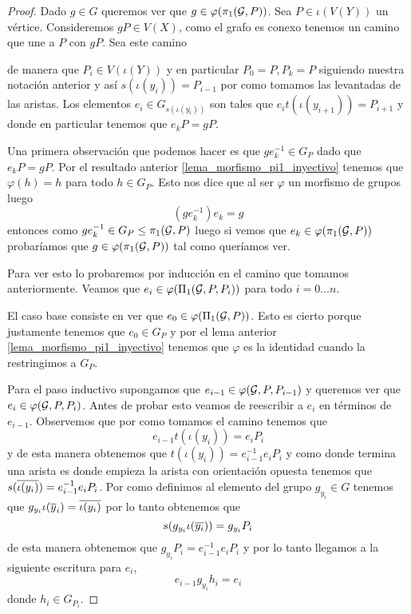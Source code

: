 \documentclass[tesis.tex]{subfiles}
\begin{document}
\begin{proof}
	Dado $g \in G$ queremos ver que $g \in \varphi(\pi_1({\cal G}, P))$.
	Sea $P \in \iota(V(Y))$ un vértice.
	Consideremos $gP \in V(X)$, como el grafo es conexo tenemos un camino que une a $P$ con $gP$. 
	Sea este camino 
	
	\begin{center}
	\end{center}
	


	de manera que $P_i \in V(\iota (Y))$ y en particular $P_0 = P, P_k = P$ siguiendo nuestra notación anterior y así $s(\iota (y_i)) = P_{i-1}$ por como tomamos las levantadas de las aristas.
	Los elementos $e_i \in G_{s(\iota (y_i))}$ son tales que $e_i t(\iota (y_{i+1})) = P_{i+1}$ y donde en particular tenemos que $e_k P = g P$.
	
	Una primera observación que podemos hacer es que $g e_k^{-1} \in G_P$ dado que  $e_k P = g P$.
	Por el resultado anterior \ref{lema_morfismo_pi1_inyectivo} tenemos que $\varphi(h) = h $ para todo $h \in G_P$.
	Esto nos dice que al ser $\varphi$ un morfismo de grupos luego 
	\[
	(ge_k^{-1}) e_k = g
	\]
	entonces como $ge_k^{-1} \in G_P \le \pi_1({\cal G}, P)$ luego si vemos que $e_k \in \varphi(\pi_1({\cal G}, P))$ probaríamos que $g \in \varphi (\pi_1({\cal G},P))$ tal como queríamos ver.
		
	Para ver esto lo probaremos por inducción en el camino que tomamos anteriormente.
	Veamos que $e_i \in \varphi(\Pi_1({\cal G}, P, P_i))$ para todo $i = 0 \dots n$.
	
	El caso base consiste en ver que $e_0 \in \varphi(\Pi_1({\cal G}, P))$.
	Esto es cierto porque justamente tenemos que $e_0 \in G_P$ y por el lema anterior \ref{lema_morfismo_pi1_inyectivo} tenemos que $\varphi$ es la identidad cuando la restringimos a $G_P$.
	
	Para el paso inductivo supongamos que $e_{i-1} \in \varphi({\cal G}, P, P_{i-1})$ y queremos ver que $e_i \in \varphi({\cal G}, P, P_{i})$.
	Antes de probar esto veamos de reescribir a $e_i$ en términos de $e_{i-1}$.
	Observemos que por como tomamos el camino tenemos que
	\[
		e_{i-1} t(\iota (y_i)) = e_i P_i 
	\]
	y de esta manera obtenemos que $t(\iota (y_i)) = e_{i-1}^{-1} e_i P_i$ y como donde termina una arista es donde empieza la arista con orientación opuesta tenemos que $s(\overline{\iota(y_i)}) = e_{i-1}^{-1} e_i P_i$. 
	Por como definimos al elemento del grupo $g_{y_i} \in G$ tenemos que $g_{y_i} \iota (\overline y_i) = \overline{\iota (y_i)}$ por lo tanto obtenemos que 
	\[
		s(g_{y_i} \iota (\overline{y_i})) = g_{y_i} P_i
	\]
	de esta manera obtenemos que $g_{y_i} P_i = e_{i-1}^{-1} e_i P_i$ y por lo tanto llegamos a la siguiente escritura para $e_i$,
	\begin{equation*}
		e_{i-1}g_{y_i} h_i  = e_i 
	\end{equation*}
	donde $h_i \in G_{P_i}$. 
	

\end{proof}
\end{document}
